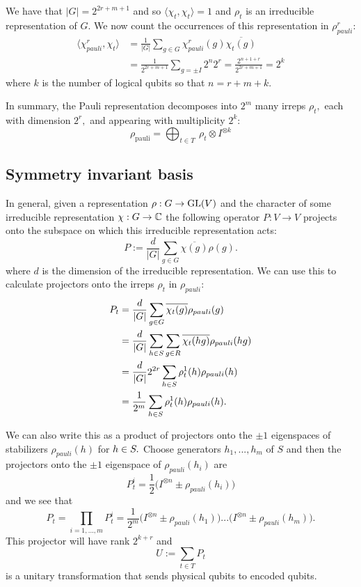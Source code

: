 We have that $|G|=2^{2r+m+1}$ and so
$\langle\chi_{t},\chi_{t}\rangle = 1$ and
$\rho_t$ is an irreducible representation of $G.$
We now count the occurrences of 
this representation in $\rho^r_{pauli}$:
\begin{align*}
\langle\chi^r_{pauli},\chi_{t}\rangle &= \frac{1}{|G|}\sum_{g\in G} \chi^r_{pauli}(g)\overline{\chi_{t}(g)} \\
&= \frac{1}{2^{2r+m+1}} \sum_{g=\pm I} 2^n 2^r = \frac{2^{n+1+r}}{2^{2r+m+1}} = 2^k
\end{align*}
where $k$ is the number of logical qubits so that $n=r+m+k.$

In summary, the Pauli representation decomposes into 
$2^m$ many irreps $\rho_t,$ 
each with dimension $2^r,$ 
and appearing with multiplicity $2^k:$
$$
    \rho_{\mathrm{pauli}} = 
        \bigoplus_{t\in T}\ \rho_t \otimes I^{\otimes k}
$$

\subsection{Symmetry invariant basis}

In general, given a representation $\rho:G\to \mathrm{GL}(V)$
and the character of some irreducible representation $\chi:G\to \mathbb{C}$
the following operator 
$P:V\to V$
projects onto the subspace on which
this irreducible representation acts:
$$
    P := \frac{d}{|G|} \sum_{g\in G} {\overline{\chi(g)}} \rho(g).
$$
where $d$ is the dimension of the irreducible representation.
We can use this to calculate projectors onto the irreps $\rho_t$ in $\rho_{pauli}$:
\begin{align*}
P_t &= \frac{d}{|G|} \sum_{g\in G} \overline{\chi_t(g)} \rho_{pauli}(g) \\
    &= \frac{d}{|G|} \sum_{h\in S}\sum_{g\in R} \overline{\chi_t(hg)} \rho_{pauli}(hg) \\
    &= \frac{d}{|G|} 2^{2r} \sum_{h\in S} {\rho^1_t(h)} \rho_{pauli}(h) \\
    &= \frac{1}{2^m} \sum_{h\in S} {\rho^1_t(h)} \rho_{pauli}(h).
\end{align*}

We can also write this as a product of projectors onto
the $\pm 1$ eigenspaces of stabilizers $\rho_{pauli}(h)$ for $h\in S.$
Choose generators $h_1,...,h_m$ of $S$
and then the projectors onto the $\pm 1$ eigenspace of $\rho_{pauli}(h_i)$ are
$$
P^i_t = \frac{1}{2} \bigl(I^{\otimes n} \pm \rho_{pauli}(h_i) \bigr)
$$
and we see that 
$$
P_t = \prod_{i=1,...,m} P^i_t 
    = \frac{1}{2^m} \bigl(I^{\otimes n} \pm \rho_{pauli}(h_1)\bigr)
    ...\bigl(I^{\otimes n} \pm \rho_{pauli}(h_m)\bigr).
$$
This projector will have rank $2^{k+r}$ and
$$
U := \sum_{t\in T} P_t
$$
is a unitary transformation that sends
physical qubits to encoded qubits.


